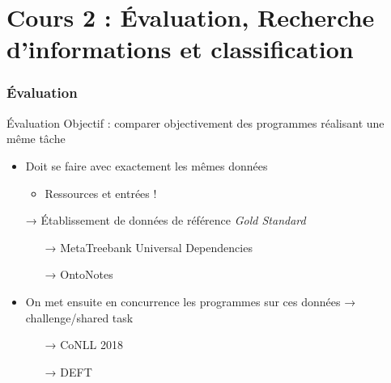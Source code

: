 \documentclass[../allslides.tex]{subfiles}
\renewcommand\titlepagesubtitle{Cours 2 : Évaluation, Recherche d'informations et classification}
\begin{document}
\part{\titlepagesubtitle{}}

\begin{frame}[plain]
	\partpage %
\end{frame}


\section{Évaluation}

\begin{frame}{Évaluation}
	Objectif : comparer \alert{objectivement} des programmes réalisant une même tâche
	\begin{itemize}
		\item Doit se faire avec exactement les mêmes données
			\begin{itemize}
				\item Ressources et entrées !
			\end{itemize}
		\item[→] Établissement de données de référence \alert{\textit{Gold Standard}}
			\begin{itemize}
				\item[→] MetaTreebank Universal Dependencies 
				\item[→] OntoNotes 
			\end{itemize}
		\item On met ensuite en concurrence les programmes sur ces données → challenge/shared task
			\begin{itemize}
				\item[→] CoNLL 2018 
				\item[→] \alert{DEFT} 
			\end{itemize}
	\end{itemize}
\end{frame}
\end{document}
